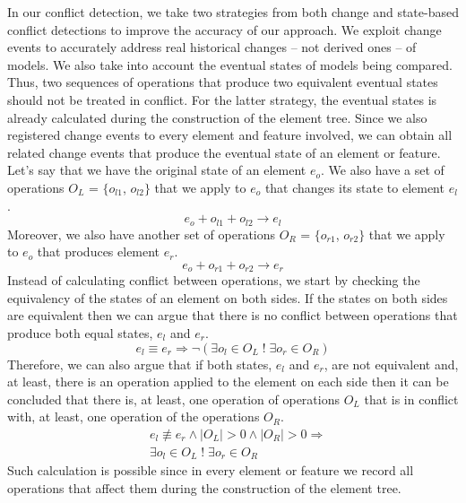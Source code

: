 In our conflict detection, we take two strategies from both change and state-based conflict detections to improve the accuracy of our approach. We exploit change events to accurately address real historical changes -- not derived ones -- of models. We also take into account the eventual states of models being compared. Thus, two sequences of operations that produce two equivalent eventual states should not be treated in conflict. For the latter strategy, the eventual states is already calculated during the construction of the \textsf{element tree}. Since we also registered change events to every element and feature involved, we can obtain all related change events that produce the eventual state of an element or feature. Let's say that we have the original state of an element $e_{o}$. We also have a set of operations $O_{L}$ = $\{$$o_{l1}$, $o_{l2}$$\}$ that we apply to $e_{o}$ that changes its state to element $e_{l}$. 
\begin{equation} \label{eq:conflict_3.1}
e_{o} + o_{l1} + o_{l2} \rightarrow e_{l}
\end{equation} 
Moreover, we also have another set of operations $O_{R}$ = $\{$$o_{r1}$, $o_{r2}$$\}$ that we apply to $e_{o}$ that produces element $e_{r}$.
\begin{equation} \label{eq:conflict_3.2}
e_{o} + o_{r1} + o_{r2} \rightarrow e_{r}
\end{equation} 
Instead of calculating conflict between operations, we start by checking the equivalency of the states of an element on both sides. If the states on both sides are equivalent then we can argue that there is no conflict between operations that produce both equal states, $e_{l}$ and $e_{r}$. 
\begin{equation} \label{eq:conflict_3.3}
e_{l} \equiv e_{r} \Rightarrow \neg(\exists o_{l} \in O_{L} \;!\; \exists o_{r} \in O_{R})
\end{equation} 
Therefore, we can also argue that if both states, $e_{l}$ and $e_{r}$, are not equivalent and, at least, there is an operation applied to the element on each side then it can be concluded that there is, at least, one operation of operations $O_{L}$ that is in conflict with, at least, one operation of the operations $O_{R}$. 
\begin{equation} \label{eq:conflict_3.10}
\begin{split}
& e_{l} \not\equiv e_{r} \wedge |O_{L}| > 0 \wedge |O_{R}| > 0 \Rightarrow\\
& \exists o_{l} \in O_{L} \;!\; \exists o_{r} \in O_{R}
\end{split}
\end{equation} 
Such calculation is possible since in every element or feature we record all operations that affect them during the construction of the element tree. 


